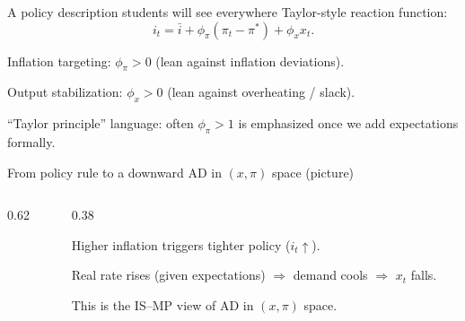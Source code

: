 \documentclass[aspectratio=169,xcolor=dvipsnames]{beamer}
\let\tempone\itemize
\let\temptwo\enditemize
\renewenvironment{itemize}{\tempone\addtolength{\itemsep}{\fill}}{\temptwo}
\begin{document}
\begin{frame}{A policy description students will see everywhere}
\small
Taylor-style reaction function:
\[
i_t = \bar i + \phi_\pi(\pi_t-\pi^\ast) + \phi_x x_t.
\]
\begin{itemize}
\item Inflation targeting: $\phi_\pi>0$ (lean against inflation deviations).
\item Output stabilization: $\phi_x>0$ (lean against overheating / slack).
\item ``Taylor principle'' language: often $\phi_\pi>1$ is emphasized once we add expectations formally.
\end{itemize}
\end{frame}

\begin{frame}{From policy rule to a downward AD in $(x,\pi)$ space (picture)}
\begin{columns}
\begin{column}{0.62\textwidth}
\centering
{}
\end{column}
\begin{column}{0.38\textwidth}
\small
\begin{itemize}
\item Higher inflation triggers tighter policy ($i_t\uparrow$).
\item Real rate rises (given expectations) $\Rightarrow$ demand cools $\Rightarrow$ $x_t$ falls.
\item This is the IS--MP view of AD in $(x,\pi)$ space.
\end{itemize}
\end{column}
\end{columns}
\end{frame}
\end{document}
